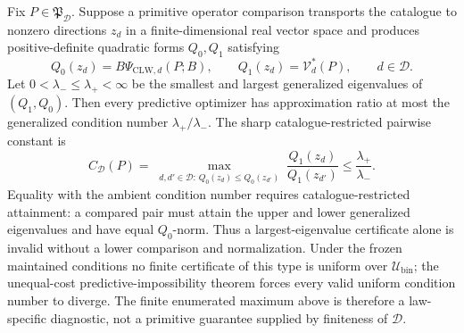 Fix \(P\in\mathfrak P_{\mathcal D}\).  Suppose a primitive operator comparison transports the catalogue to nonzero directions \(z_d\) in a finite-dimensional real vector space and produces positive-definite quadratic forms \(Q_0,Q_1\) satisfying
\[
 Q_0(z_d)=B\Psi_{\mathrm{CLW},d}(P;B),\qquad
 Q_1(z_d)=\mathcal V_d^*(P),\qquad d\in\mathcal D.
\]
Let \(0<\lambda_-\le\lambda_+<\infty\) be the smallest and largest generalized eigenvalues of \((Q_1,Q_0)\).  Then every predictive optimizer has approximation ratio at most the generalized condition number \(\lambda_+/\lambda_-\).  The sharp catalogue-restricted pairwise constant is
\[
 C_{\mathcal D}(P)=
 \max_{\substack{d,d'\in\mathcal D:\,
 Q_0(z_d)\le Q_0(z_{d'})}}
 \frac{Q_1(z_d)}{Q_1(z_{d'})}
 \le\frac{\lambda_+}{\lambda_-}.
\]
Equality with the ambient condition number requires catalogue-restricted attainment: a compared pair must attain the upper and lower generalized eigenvalues and have equal \(Q_0\)-norm.  Thus a largest-eigenvalue certificate alone is invalid without a lower comparison and normalization.  Under the frozen maintained conditions no finite certificate of this type is uniform over \(\mathcal U_{\mathrm{bin}}\); the unequal-cost predictive-impossibility theorem forces every valid uniform condition number to diverge.  The finite enumerated maximum above is therefore a law-specific diagnostic, not a primitive guarantee supplied by finiteness of \(\mathcal D\).